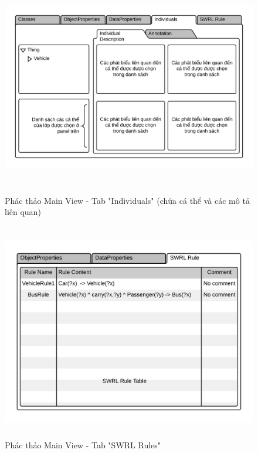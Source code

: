 \begin{figure}[h!]
	\centering
	\includegraphics[width=150mm,height=95mm]{Figures/ui_mainview_individual.png}
	\caption{Phác thảo Main View - Tab "Individuals" (chứa cá thể và các mô tả liên quan) \label{overflow}}
\end{figure}
\begin{figure}[h!]
	\centering
	\includegraphics[width=150mm,height=95mm]{Figures/ui_mainview_swrltab.png}
	\caption{Phác thảo Main View - Tab "SWRL Rules" \label{overflow}}
\end{figure}


